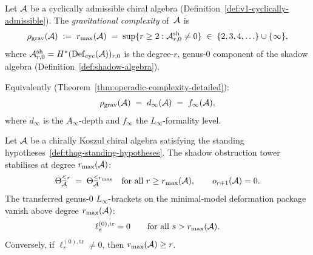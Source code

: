 \begin{definition}
\label{def:thqg-gravitational-complexity}
Let $\mathcal{A}$ be a cyclically admissible chiral algebra
(Definition~\ref{def:v1-cyclically-admissible}).
The \emph{gravitational complexity} of~$\mathcal{A}$ is
\begin{equation}\label{eq:thqg-grav-complexity}
\rho_{\mathrm{grav}}(\mathcal{A})
\;:=\;
r_{\max}(\mathcal{A})
\;=\;
\sup\{r \geq 2 : \mathcal{A}^{\mathrm{sh}}_{r,0} \neq 0\}
\;\in\;
\{2, 3, 4, \ldots\} \cup \{\infty\},
\end{equation}
where $\mathcal{A}^{\mathrm{sh}}_{r,0} =
H^*(\mathrm{Def}_{\mathrm{cyc}}(\mathcal{A}))_{r,0}$ is the degree-$r$, genus-$0$
component of the shadow algebra
(Definition~\ref{def:shadow-algebra}).

Equivalently (Theorem~\ref{thm:operadic-complexity-detailed}):
\begin{equation}\label{eq:thqg-three-invariants}
\rho_{\mathrm{grav}}(\mathcal{A})
\;=\;
d_\infty(\mathcal{A})
\;=\;
f_\infty(\mathcal{A}),
\end{equation}
where $d_\infty$ is the $A_\infty$-depth and $f_\infty$
the $L_\infty$-formality level.
\end{definition}

\begin{theorem}
\label{thm:thqg-complexity-controls-bulk}
\ClaimStatusProvedHere
{}
Let $\mathcal{A}$ be a chirally Koszul chiral algebra satisfying the
standing hypotheses~\textup{\ref{def:thqg-standing-hypotheses}}.
The shadow obstruction tower stabilises at degree $r_{\max}(\mathcal{A})$:
\begin{equation}\label{eq:thqg-stabilization}
\Theta_{\mathcal{A}}^{\leq r}
\;=\;
\Theta_{\mathcal{A}}^{\leq r_{\max}}
\quad \text{for all } r \geq r_{\max}(\mathcal{A}),
\qquad
o_{r+1}(\mathcal{A}) = 0.
\end{equation}
The transferred genus-$0$ $L_\infty$-brackets on the
minimal-model deformation package vanish above degree
$r_{\max}(\mathcal{A})$:
\begin{equation}\label{eq:thqg-transferred-degree-cutoff}
\ell_s^{(0),\mathrm{tr}} = 0
\qquad \text{for all } s > r_{\max}(\mathcal{A}).
\end{equation}
Conversely, if $\ell_r^{(0),\mathrm{tr}} \neq 0$, then
$r_{\max}(\mathcal{A}) \geq r$.
\end{theorem}

